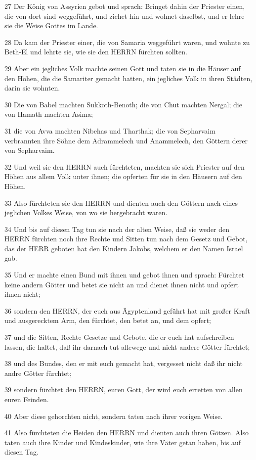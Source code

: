 \par 27 Der König von Assyrien gebot und sprach: Bringet dahin der Priester einen, die von dort sind weggeführt, und ziehet hin und wohnet daselbst, und er lehre sie die Weise Gottes im Lande.
\par 28 Da kam der Priester einer, die von Samaria weggeführt waren, und wohnte zu Beth-El und lehrte sie, wie sie den HERRN fürchten sollten.
\par 29 Aber ein jegliches Volk machte seinen Gott und taten sie in die Häuser auf den Höhen, die die Samariter gemacht hatten, ein jegliches Volk in ihren Städten, darin sie wohnten.
\par 30 Die von Babel machten Sukkoth-Benoth; die von Chut machten Nergal; die von Hamath machten Asima;
\par 31 die von Avva machten Nibehas und Tharthak; die von Sepharvaim verbrannten ihre Söhne dem Adrammelech und Anammelech, den Göttern derer von Sepharvaim.
\par 32 Und weil sie den HERRN auch fürchteten, machten sie sich Priester auf den Höhen aus allem Volk unter ihnen; die opferten für sie in den Häusern auf den Höhen.
\par 33 Also fürchteten sie den HERRN und dienten auch den Göttern nach eines jeglichen Volkes Weise, von wo sie hergebracht waren.
\par 34 Und bis auf diesen Tag tun sie nach der alten Weise, daß sie weder den HERRN fürchten noch ihre Rechte und Sitten tun nach dem Gesetz und Gebot, das der HERR geboten hat den Kindern Jakobs, welchem er den Namen Israel gab.
\par 35 Und er machte einen Bund mit ihnen und gebot ihnen und sprach: Fürchtet keine andern Götter und betet sie nicht an und dienet ihnen nicht und opfert ihnen nicht;
\par 36 sondern den HERRN, der euch aus Ägyptenland geführt hat mit großer Kraft und ausgerecktem Arm, den fürchtet, den betet an, und dem opfert;
\par 37 und die Sitten, Rechte Gesetze und Gebote, die er euch hat aufschreiben lassen, die haltet, daß ihr darnach tut allewege und nicht andere Götter fürchtet;
\par 38 und des Bundes, den er mit euch gemacht hat, vergesset nicht daß ihr nicht andre Götter fürchtet;
\par 39 sondern fürchtet den HERRN, euren Gott, der wird euch erretten von allen euren Feinden.
\par 40 Aber diese gehorchten nicht, sondern taten nach ihrer vorigen Weise.
\par 41 Also fürchteten die Heiden den HERRN und dienten auch ihren Götzen. Also taten auch ihre Kinder und Kindeskinder, wie ihre Väter getan haben, bis auf diesen Tag.

